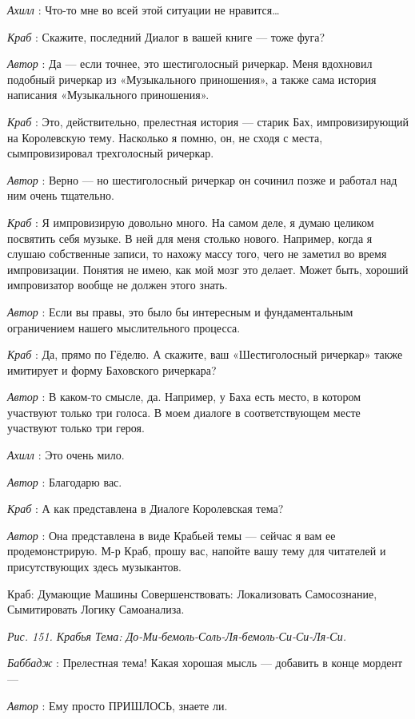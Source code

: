 \emph{Ахилл} : Что-то мне во всей этой ситуации не нравится\ldots{}

\emph{Краб} : Скажите, последний Диалог в вашей книге --- тоже фуга?

\emph{Автор} : Да --- если точнее, это шестиголосный ричеркар. Меня вдохновил подобный ричеркар из «Музыкального приношения», а также сама история написания «Музыкального приношения».

\emph{Краб} : Это, действительно, прелестная история --- старик Бах, импровизирующий на Королевскую тему. Насколько я помню, он, не сходя с места, сымпровизировал трехголосный ричеркар.

\emph{Автор} : Верно --- но шестиголосный ричеркар он сочинил позже и работал над ним очень тщательно.

\emph{Краб} : Я импровизирую довольно много. На самом деле, я думаю целиком посвятить себя музыке. В ней для меня столько нового. Например, когда я слушаю собственные записи, то нахожу массу того, чего не заметил во время импровизации. Понятия не имею, как мой мозг это делает. Может быть, хороший импровизатор вообще не должен этого знать.

\emph{Автор} : Если вы правы, это было бы интересным и фундаментальным ограничением нашего мыслительного процесса.

\emph{Краб} : Да, прямо по Гёделю. А скажите, ваш «Шестиголосный ричеркар» также имитирует и форму Баховского ричеркара?

\emph{Автор} : В каком-то смысле, да. Например, у Баха есть место, в котором участвуют только три голоса. В моем диалоге в соответствующем месте участвуют только три героя.

\emph{Ахилл} : Это очень мило.

\emph{Автор} : Благодарю вас.

\emph{Краб} : А как представлена в Диалоге Королевская тема?

\emph{Автор} : Она представлена в виде Крабьей темы --- сейчас я вам ее продемонстрирую. М-р Краб, прошу вас, напойте вашу тему для читателей и присутствующих здесь музыкантов.

Краб: Думающие Машины Совершенствовать: Локализовать Самосознание, Сымитировать Логику Самоанализа.

\emph{Рис. 151. Крабья Тема: До-Ми-бемоль-Соль-Ля-бемоль-Си-Си-Ля-Си.}

\emph{Баббадж} : Прелестная тема! Какая хорошая мысль --- добавить в конце мордент ---

\emph{Автор} : Ему просто ПРИШЛОСЬ, знаете ли.

